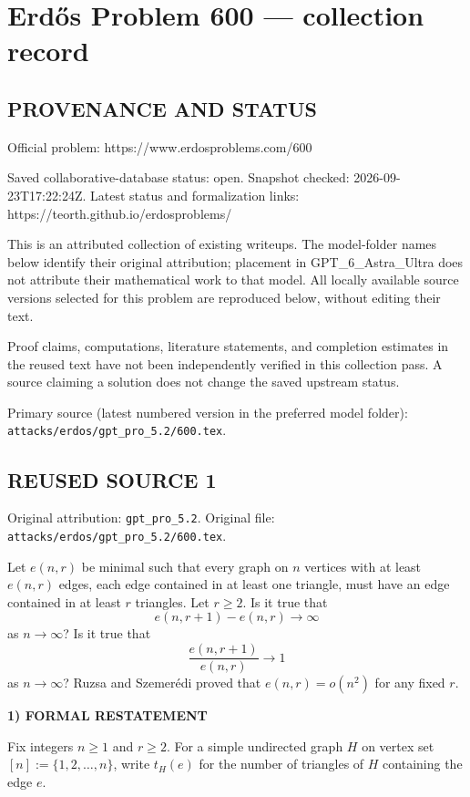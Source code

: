 \section*{Erd\H{o}s Problem 600 --- collection record}

\subsection*{PROVENANCE AND STATUS}
Official problem: https://www.erdosproblems.com/600

Saved collaborative-database status: open.
Snapshot checked: 2026-09-23T17:22:24Z.
Latest status and formalization links: https://teorth.github.io/erdosproblems/

This is an attributed collection of existing writeups. The model-folder names below identify their original attribution; placement in GPT\_6\_Astra\_Ultra does not attribute their mathematical work to that model. All locally available source versions selected for this problem are reproduced below, without editing their text.

Proof claims, computations, literature statements, and completion estimates in the reused text have not been independently verified in this collection pass. A source claiming a solution does not change the saved upstream status.

Primary source (latest numbered version in the preferred model folder): \texttt{attacks/erdos/gpt\_pro\_5.2/600.tex}.

\subsection*{REUSED SOURCE 1}
Original attribution: \texttt{gpt\_pro\_5.2}.
Original file: \texttt{attacks/erdos/gpt\_pro\_5.2/600.tex}.


Let $e(n,r)$ be minimal such that every graph on $n$ vertices with at least $e(n,r)$ edges, each edge contained in at least one triangle, must have an edge contained in at least $r$ triangles. Let $r\geq 2$. Is it true that\[e(n,r+1)-e(n,r)\to \infty\]
as $n\to \infty$? Is it true that\[\frac{e(n,r+1)}{e(n,r)}\to 1\]
as $n\to \infty$? Ruzsa and Szemer\'{e}di \cite{RuSz78} proved that $e(n,r)=o(n^2)$ for any fixed $r$.

\noindent\textbf{1) FORMAL RESTATEMENT}\par
Fix integers $n\ge 1$ and $r\ge 2$.
For a simple undirected graph $H$ on vertex set $[n]:=\{1,2,\dots,n\}$, write $t_H(e)$ for the number of triangles of $H$ containing the edge $e$.

